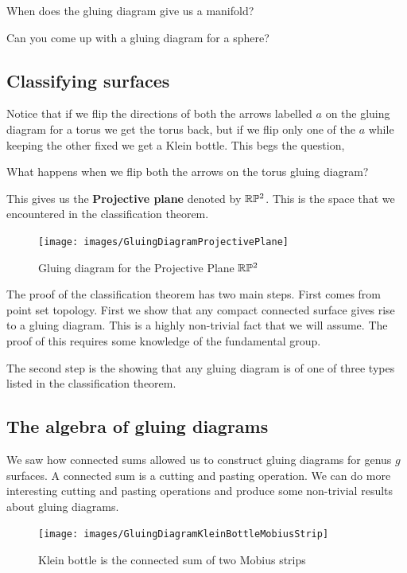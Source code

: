 \begin{ques}
	When does the gluing diagram give us a manifold?
\end{ques}

\begin{ques}
	Can you come up with a gluing diagram for a sphere?
\end{ques}

\subsection{Classifying surfaces}
Notice that if we flip the directions of both the arrows labelled $a$ on the gluing diagram for a torus we get the torus back, but if we flip only one of the $a$ while keeping the other fixed we get a Klein bottle. This begs the question,

\begin{ques}
	What happens when we flip both the arrows on the torus gluing diagram?
\end{ques}
This gives us the \textbf{Projective plane} denoted by $\mathbb{R}\mathbb{P}^2$. This is the space that we encountered in the classification theorem.
\begin{figure}[H]
	\centering
	\texttt{[image: images/GluingDiagramProjectivePlane]}
	\caption{Gluing diagram for the Projective Plane $\mathbb{R}\mathbb{P}^2$}
\end{figure}

The proof of the classification theorem has two main steps. First comes from point set topology. First we show that any compact connected surface gives rise to a gluing diagram. This is a highly non-trivial fact that we will assume. The proof of this requires some knowledge of the fundamental group.

The second step is the showing that any gluing diagram is of one of three types listed in the classification theorem.

\subsection{The algebra of gluing diagrams}
We saw how connected sums allowed us to construct gluing diagrams for genus $g$ surfaces. A connected sum is a cutting and pasting operation. We can do more interesting cutting and pasting operations and produce some non-trivial results about gluing diagrams.

\begin{figure}[h]
	\centering
	\texttt{[image: images/GluingDiagramKleinBottleMobiusStrip]}
	\caption{Klein bottle is the connected sum of two Mobius strips}
\end{figure}
\fi










